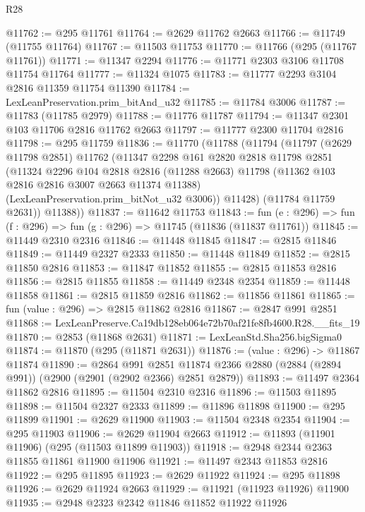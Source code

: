 \begin{lexlean}{R28}
\begin{coremodule}
@11762 := @295 @11761
@11764 := @2629 @11762 @2663
@11766 := @11749 (@11755 @11764)
@11767 := @11503 @11753
@11770 := @11766 (@295 (@11767 @11761))
@11771 := @11347 @2294
@11776 := @11771 @2303 @3106 @11708 @11754 @11764
@11777 := @11324 @1075
@11783 := @11777 @2293 @3104 @2816 @11359 @11754 @11390
@11784 := LexLeanPreservation.prim_bitAnd_u32
@11785 := @11784 @3006
@11787 := @11783 (@11785 @2979)
@11788 := @11776 @11787
@11794 := @11347 @2301 @103 @11706 @2816 @11762 @2663
@11797 := @11777 @2300 @11704 @2816
@11798 := @295 @11759
@11836 := @11770
    (@11788
      (@11794
        (@11797
          (@2629 @11798 @2851)
          @11762
          (@11347
            @2298
            @161
            @2820
            @2818
            @11798
            @2851
            (@11324
              @2296
              @104
              @2818
              @2816
              (@11288 @2663)
              @11798
              (@11362 @103 @2816 @2816 @3007 @2663 @11374 @11388)
              (LexLeanPreservation.prim_bitNot_u32 @3006))
            @11428)
          (@11784 @11759 @2631))
        @11388))
@11837 := @11642 @11753
@11843 := fun (e : @296) => fun (f : @296) => fun (g : @296) => @11745 (@11836 (@11837 @11761))
@11845 := @11449 @2310 @2316
@11846 := @11448 @11845
@11847 := @2815 @11846
@11849 := @11449 @2327 @2333
@11850 := @11448 @11849
@11852 := @2815 @11850 @2816
@11853 := @11847 @11852
@11855 := @2815 @11853 @2816
@11856 := @2815 @11855
@11858 := @11449 @2348 @2354
@11859 := @11448 @11858
@11861 := @2815 @11859 @2816
@11862 := @11856 @11861
@11865 := fun (value : @296) => @2815 @11862 @2816
@11867 := @2847 @991 @2851
@11868 := LexLeanPreserve.Ca19db128eb064e72b70af21fe8fb4600.R28.__fits_19
@11870 := @2853 (@11868 @2631)
@11871 := LexLeanStd.Sha256.bigSigma0
@11874 := @11870 (@295 (@11871 @2631))
@11876 := (value : @296) -> @11867 @11874
@11890 := @2864
    @991
    @2851
    @11874
    @2366
    @2880
    (@2884 (@2894 @991))
    (@2900 (@2901 (@2902 @2366) @2851 @2879))
@11893 := @11497 @2364 @11862 @2816
@11895 := @11504 @2310 @2316
@11896 := @11503 @11895
@11898 := @11504 @2327 @2333
@11899 := @11896 @11898
@11900 := @295 @11899
@11901 := @2629 @11900
@11903 := @11504 @2348 @2354
@11904 := @295 @11903
@11906 := @2629 @11904 @2663
@11912 := @11893 (@11901 @11906) (@295 (@11503 @11899 @11903))
@11918 := @2948 @2344 @2363 @11855 @11861 @11900 @11906
@11921 := @11497 @2343 @11853 @2816
@11922 := @295 @11895
@11923 := @2629 @11922
@11924 := @295 @11898
@11926 := @2629 @11924 @2663
@11929 := @11921 (@11923 @11926) @11900
@11935 := @2948 @2323 @2342 @11846 @11852 @11922 @11926

\end{coremodule}
\end{lexlean}
